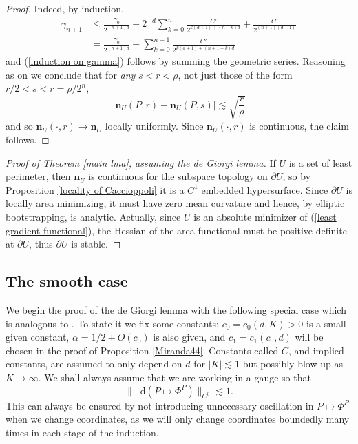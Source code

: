 \documentclass[reqno,11pt]{amsart}
\newcommand*\dif{\mathop{}\!\mathrm{d}}
\newcommand{\normal}{\mathbf n}
\theoremstyle{definition}
\numberwithin{equation}{section}
\begin{document}
\begin{proof}
Indeed, by induction,
\begin{align*}
\gamma_{n + 1}
&\leq \frac{\gamma_0}{2^{(n + 1)d}} + 2^{-d} \sum_{k=0}^n \frac{C'}{2^{k(d + 1) + (n - k)d}} + \frac{C'}{2^{(n + 1)(d + 1)}} \\
&= \frac{\gamma_0}{2^{(n + 1)d}} + \sum_{k=0}^{n + 1} \frac{C'}{2^{k(d + 1) + (n + 1 - k)d}}
\end{align*}
and (\ref{induction on gamma}) follows by summing the geometric series.
Reasoning as on \cite[pg100]{Giusti77} we conclude that for \emph{any} $s < r < \rho$, not just those of the form $r/2 < s < r = \rho/2^n$,
$$|\normal_U(P, r) - \normal_U(P, s)| \lesssim \sqrt{\frac{r}{\rho}}$$
and so $\normal_U(\cdot, r) \to \normal_U$ locally uniformly.
Since $\normal_U(\cdot, r)$ is continuous, the claim follows.
\end{proof}

\begin{proof}[Proof of Theorem \ref{main lma}, assuming the de Giorgi lemma]
If $U$ is a set of least perimeter, then $\normal_U$ is continuous for the subspace topology on $\partial U$, so by Proposition \ref{locality of Caccioppoli} it is a $C^1$ embedded hypersurface.
Since $\partial U$ is locally area minimizing, it must have zero mean curvature and hence, by elliptic bootstrapping, is analytic.
Actually, since $U$ is an absolute minimizer of (\ref{least gradient functional}), the Hessian of the area functional must be positive-definite at $\partial U$, thus $\partial U$ is stable.
\end{proof}


\subsection{The smooth case}
We begin the proof of the de Giorgi lemma with the following special case which is analogous to \cite[Lemma 6.4]{Giusti77}.
To state it we fix some constants: $c_0 = c_0(d, K) > 0$ is a small given constant, $\alpha = 1/2 + O(c_0)$ is also given, and $c_1 = c_1(c_0, d)$ will be chosen in the proof of Proposition \ref{Miranda44}.
Constants called $C$, and implied constants, are assumed to only depend on $d$ for $|K| \lesssim 1$ but possibly blow up as $K \to \infty$.
We shall always assume that we are working in a gauge so that
\begin{equation}\label{oscillation of isometries}
\|\dif(P \mapsto \Phi^P)\|_{C^0} \lesssim 1.
\end{equation}
This can always be ensured by not introducing unnecessary oscillation in $P \mapsto \Phi^P$ when we change coordinates, as we will only change coordinates boundedly many times in each stage of the induction.
\end{document}
